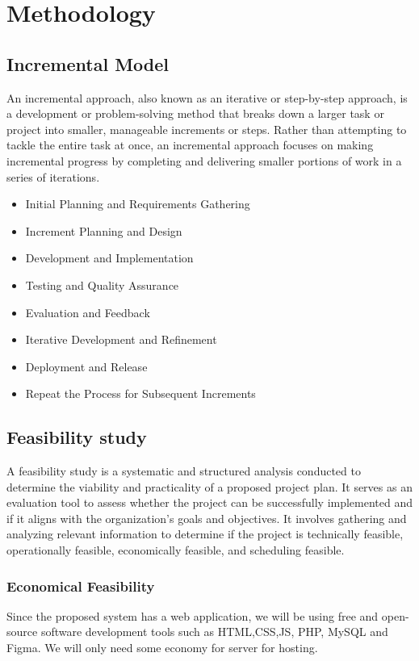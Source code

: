 \documentclass{article}
\begin{document}
\section{Methodology}
\subsection{Incremental Model}
An incremental approach, also known as an iterative or step-by-step approach, is a development or problem-solving method that breaks down a larger task or project into smaller, manageable increments or steps. Rather than attempting to tackle the entire task at once, an incremental approach focuses on making incremental progress by completing and delivering smaller portions of work in a series of iterations.\\
\begin{itemize}
    \item Initial Planning and Requirements Gathering
    \item Increment Planning and Design
    \item Development and Implementation
    \item Testing and Quality Assurance
    \item Evaluation and Feedback
    \item Iterative Development and Refinement
    \item Deployment and Release
    \item Repeat the Process for Subsequent Increments
\end{itemize}

\subsection{Feasibility study}
A feasibility study is a systematic and structured analysis conducted to determine the viability and practicality of a proposed project plan. It serves as an evaluation tool to assess whether the project can be successfully implemented and if it aligns with the organization's goals and objectives. It involves gathering and analyzing relevant information to determine if the project is technically feasible, operationally feasible, economically feasible, and scheduling feasible.
\subsubsection{Economical Feasibility}
Since the proposed system has a web application, we will be using free and open-source software development tools such as HTML,CSS,JS, PHP, MySQL and Figma. We will only need some economy for server for hosting.
\end{document}
